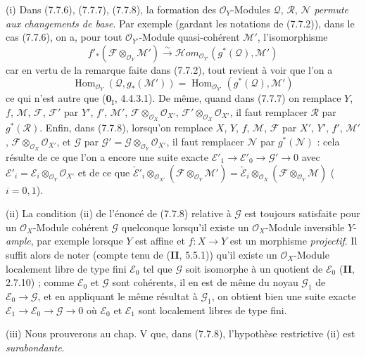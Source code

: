 \begin{remarks}[7.7.9]
\textnormal{(i)} Dans (7.7.6), (7.7.7), (7.7.8), la formation des
$\mathscr O_Y$-Modules $\mathscr Q$, $\mathscr R$, $\mathscr N$ \emph{permute aux
changements de base}. Par exemple (gardant les notations de (7.7.2)), dans le
cas (7.7.6), on a, pour tout $\mathscr O_{Y'}$-Module quasi-cohérent
$\mathscr M'$, l'isomorphisme
\[
  f'_*(\mathscr F\otimes_{\mathscr O_Y}\mathscr M')
  \xrightarrow{\sim}
  \mathscr{H}\!om_{\mathscr O_{Y'}}(g^*(\mathscr Q),\mathscr M')
\]
car en vertu de la remarque faite dans (7.7.2), tout revient à voir que l'on a
\[
  \operatorname{Hom}_{\mathscr O_Y}(\mathscr Q,g_*(\mathscr M'))
  =
  \operatorname{Hom}_{\mathscr O_{Y'}}(g^*(\mathscr Q),\mathscr M')
\]
ce qui n'est autre que ($\mathbf{0}_{\mathrm I}$, 4.4.3.1). De même, quand dans (7.7.7)
on remplace $Y$, $f$, $\mathscr M$, $\mathscr F$, $\mathscr F'$ par $Y'$, $f'$,
$\mathscr M'$, $\mathscr F\otimes_{\mathscr O_X}\mathscr O_{X'}$,
$\mathscr F'\otimes_{\mathscr O_X}\mathscr O_{X'}$, il faut remplacer
$\mathscr R$ par $g^*(\mathscr R)$. Enfin, dans (7.7.8), lorsqu'on remplace $X$,
$Y$, $f$, $\mathscr M$, $\mathscr F$ par $X'$, $Y'$, $f'$, $\mathscr M'$,
$\mathscr F\otimes_{\mathscr O_X}\mathscr O_{X'}$, et $\mathscr G$ par
$\mathscr G'=\mathscr G\otimes_{\mathscr O_Y}\mathscr O_{X'}$, il faut remplacer
$\mathscr N$ par $g^*(\mathscr N)$ : cela résulte de ce que l'on a encore une
suite exacte
$\mathscr E'_1\longrightarrow\mathscr E'_0\longrightarrow\mathscr G'\longrightarrow0$ avec
$\mathscr E'_i=\mathscr E_i\otimes_{\mathscr O_Y}\mathscr O_{X'}$
et de ce que
$  \check{\mathscr E}'_i
  \otimes_{\mathscr O_{X'}}
  (\mathscr F\otimes_{\mathscr O_Y}\mathscr M')
  =
  \check{\mathscr E}_i
  \otimes_{\mathscr O_X}
  (\mathscr F\otimes_{\mathscr O_Y}\mathscr M)$ ($i=0,1$).

\medskip
\textnormal{(ii)} La condition (ii) de l'énoncé de (7.7.8) relative à
$\mathscr G$ est toujours satisfaite pour un $\mathscr O_X$-Module cohérent
$\mathscr G$ quelconque lorsqu'il existe un $\mathscr O_X$-Module inversible
$Y$-\emph{ample}, par exemple lorsque $Y$ est affine et $f:X\to Y$ est un morphisme
\emph{projectif}. Il suffit alors de noter (compte tenu de (\textbf{II}, 5.5.1)) qu'il existe un
$\mathscr O_X$-Module localement libre de type fini $\mathscr E_0$ tel que
$\mathscr G$ soit isomorphe à un quotient de $\mathscr E_0$ (\textbf{II}, 2.7.10) ; comme
$\mathscr E_0$ et $\mathscr G$ sont cohérents, il en est de même du noyau
$\mathscr G_1$ de $\mathscr E_0\to\mathscr G$, et en appliquant le même résultat
à $\mathscr G_1$, on obtient bien une suite exacte
$\mathscr E_1\to\mathscr E_0\to\mathscr G\to0$ où $\mathscr E_0$ et
$\mathscr E_1$ sont localement libres de type fini.

\medskip
\textnormal{(iii)} Nous prouverons au chap. V que, dans (7.7.8), l'hypothèse
restrictive (ii) est \emph{surabondante}.
\end{remarks}


